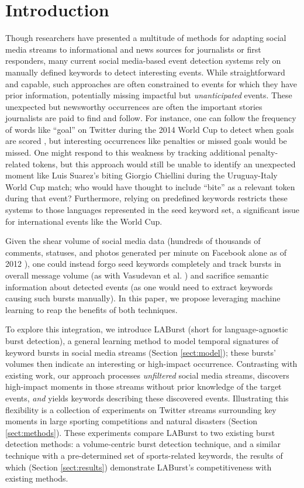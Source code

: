 \documentclass[letterpaper]{article}
\begin{document}
\section{Introduction}

Though researchers have presented a multitude of methods for adapting social media streams to informational and news sources for journalists or first responders, many current social media-based event detection systems rely on manually defined keywords to detect interesting events.
While straightforward and capable, such approaches are often constrained to events for which they have prior information, potentially missing impactful but \emph{unanticipated} events.
These unexpected but newsworthy occurrences are often the important stories journalists are paid to find and follow.
For instance, one can follow the frequency of words like ``goal'' on Twitter during the 2014 World Cup to detect when goals are scored \cite{Cipriani2014}, but interesting occurrences like penalties or missed goals would be missed.
One might respond to this weakness by tracking additional penalty-related tokens, but this approach would still be unable to identify an unexpected moment like Luis Suarez's biting Giorgio Chiellini during the Uruguay-Italy World Cup match; who would have thought to include ``bite'' as a relevant token during that event?
Furthermore, relying on predefined keywords restricts these systems to those languages represented in the seed keyword set, a significant issue for international events like the World Cup.

Given the shear volume of social media data (hundreds of thousands of comments, statuses, and photos generated per minute on Facebook alone as of 2012 \cite{Pring2012}), one could instead forgo seed keywords completely and track bursts in overall message volume (as with Vasudevan et al. \cite{vasudevan2013twitter}) and sacrifice semantic information about detected events (as one would need to extract keywords causing such bursts manually).
In this paper, we propose leveraging machine learning to reap the benefits of both techniques.

To explore this integration, we introduce LABurst (short for language-agnostic burst detection), a general learning method to model temporal signatures of keyword bursts in social media streams (Section \ref{sect:model}); these bursts' volumes then indicate an interesting or high-impact occurrence. 
Contrasting with existing work, our approach processes \emph{unfiltered} social media streams, discovers high-impact moments in those streams without prior knowledge of the target events, \emph{and} yields keywords describing these discovered events.
Illustrating this flexibility is a collection of experiments on Twitter streams surrounding key moments in large sporting competitions and natural disasters (Section \ref{sect:methods}).
These experiments compare LABurst to two existing burst detection methods: a volume-centric burst detection technique, and a similar technique with a pre-determined set of sports-related keywords, the results of which (Section \ref{sect:results}) demonstrate LABurst's competitiveness with existing methods.
\end{document}

